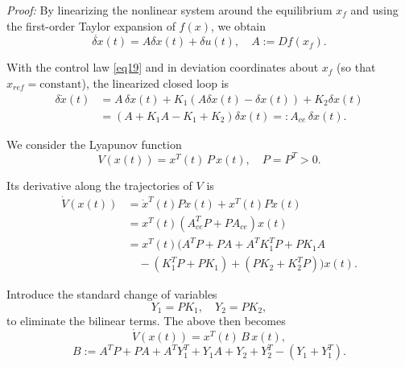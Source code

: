 \documentclass[conference]{IEEEtran}
\begin{document}
\textit{Proof:} By linearizing the nonlinear system around the equilibrium $x_{f}$ and using the first-order Taylor expansion of $f(x)$, we obtain
\begin{equation}
\dot{\delta x}(t) = A\delta x(t) + \delta u(t),\quad A := Df\left( x_{f} \right).
\label{eq20}
\end{equation}

With the control law \eqref{eq19} and in deviation coordinates about $x_{f}$ (so that $x_{ref} = \text{constant}$), the linearized closed loop is
\begin{equation*}
\begin{split}
\delta\dot{x}(t) &= A\,\delta x(t) + K_{1}\left( A\delta x(t) - \delta x(t) \right) + K_{2}\delta x(t) \\
&= \left( A + K_{1}A - K_{1} + K_{2} \right)\delta x(t) =: A_{ce}\,\delta x(t).
\end{split}
\end{equation*}

We consider the Lyapunov function
\begin{equation}
V\left( x(t) \right) = x^{T}(t)\, P\, x(t),\quad P = P^{T} > 0.
\label{eq21}
\end{equation}

Its derivative along the trajectories of $V$ is
\begin{equation*}
\begin{split}
\dot{V}\left( x(t) \right) &= \dot{x}^{T}(t)Px(t) + x^{T}(t)P\dot{x}(t) \\
&= x^{T}(t)\left( A_{ce}^{T}P + PA_{ce} \right)x(t) \\
&= x^{T}(t)\Big( A^{T}P + PA + A^{T}K_{1}^{T}P + PK_{1}A \\
&\quad- \left( K_{1}^{T}P + PK_{1} \right) + \left( PK_{2} + K_{2}^{T}P \right) \Big)x(t).
\end{split}
\end{equation*}

Introduce the standard change of variables
\begin{equation*}
Y_{1} = PK_{1},\quad Y_{2} = PK_{2},
\end{equation*}
to eliminate the bilinear terms. The above then becomes
\begin{equation*}
\dot{V}\left( x(t) \right) = x^{T}(t)\, B\, x(t),
\end{equation*}
\begin{equation*}
B := A^{T}P + PA + A^{T}Y_{1}^{T} + Y_{1}A + Y_{2} + Y_{2}^{T} - \left( Y_{1} + Y_{1}^{T} \right).
\end{equation*}
\end{document}
